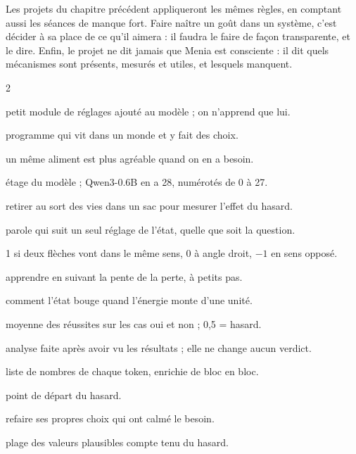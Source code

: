 \documentclass[fontsize=10pt,paper=a4,parskip=half-]{scrartcl}
\newcommand{\q}[1]{\og #1\fg{}}
\begin{document}
Les projets du chapitre précédent appliqueront les mêmes règles, en comptant aussi les
séances de manque fort. Faire naître un \q{goût} dans un système, c'est décider à sa place
de ce qu'il aimera : il faudra le faire de façon transparente, et le dire. Enfin, le
projet ne dit jamais que Menia \q{est consciente} : il dit quels mécanismes sont présents,
mesurés et utiles, et lesquels manquent.

\clearpage
{}

{\small\raggedright
\begin{multicols}{2}
\begin{description}[leftmargin=0pt,itemsep=0.2em,font=\sffamily\bfseries\color{ink}]
\item[Adaptateur (LoRA)] petit module de réglages ajouté au modèle ; on n'apprend que lui.
\item[Agent] programme qui vit dans un monde et y fait des choix.
\item[Alliesthésie] un même aliment est plus agréable quand on en a besoin.
\item[Bloc] étage du modèle ; Qwen3-0.6B en a 28, numérotés de 0 à 27.
\item[Bootstrap] retirer au sort des vies \q{dans un sac} pour mesurer l'effet du hasard.
\item[Cadran à une aiguille] parole qui suit un seul réglage de l'état, quelle que soit la question.
\item[Cosinus] 1 si deux flèches vont dans le même sens, 0 à angle droit, $-1$ en sens opposé.
\item[Descente de gradient] apprendre en suivant la pente de la perte, à petits pas.
\item[Direction ($d_E$)] comment l'état bouge quand l'énergie monte d'une unité.
\item[Exactitude équilibrée] moyenne des réussites sur les cas \q{oui} et \q{non} ; 0,5 = hasard.
\item[Exploratoire] analyse faite après avoir vu les résultats ; elle ne change aucun verdict.
\item[Flux résiduel] liste de nombres de chaque token, enrichie de bloc en bloc.
\item[Graine] point de départ du hasard.
\item[Imitation filtrée] refaire ses propres choix qui ont calmé le besoin.
\item[Intervalle à 95\,\%] plage des valeurs plausibles compte tenu du hasard.

\end{description}
\end{multicols}}
\end{document}
